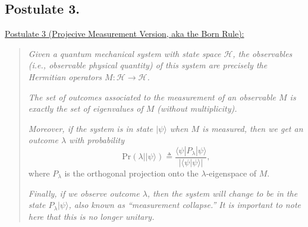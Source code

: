 \documentclass{article}
\newcommand{\ket}[1]{|#1\rangle}
\newcommand{\braket}[2]{\langle#1|#2\rangle}
\newcommand{\calH}{\mathcal{H}}
\begin{document}
\subsection{Postulate 3.}
\begin{framed}
\underline{Postulate 3 (Projecive Measurement Version, aka the Born Rule):}
\begin{quote}
\textit{Given a quantum mechanical system with state space $\calH$, the {\em observables} (i.e., observable physical quantity) of this system are precisely the Hermitian operators $M: \calH \to \calH$.}

\textit{The set of {\em outcomes} associated to the measurement of an observable $M$ is exactly the set of eigenvalues of $M$ (without multiplicity).}

\textit{Moreover, if the system is in state $\ket{\psi}$ when $M$ is measured, then we get an outcome $\lambda$ with probability
\begin{equation}
    \label{eq: measure-prob}
    \mathrm{Pr}(\lambda|\ket{\psi}) \triangleq \frac{\braket{\psi|P_{\lambda}}{\psi}}{\lvert\braket{\psi}{\psi} \rvert},
\end{equation}
}
where $P_{\lambda}$ is the orthogonal projection onto the $\lambda$-eigenspace of $M$. 

\textit{Finally, if we observe outcome $\lambda$, then the system will change to be in the state $P_{\lambda}\ket{\psi}$, also known as ``measurement collapse.'' It is important to note here that this is no longer unitary.}
\end{quote}
\end{framed}
\end{document}
